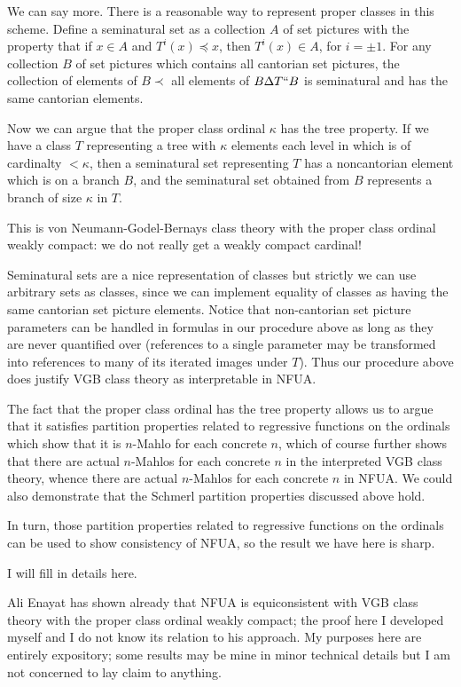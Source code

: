 \documentclass[12pt]{article}
\begin{document}
We can say more.  There is a reasonable way to represent proper classes in this scheme.  Define a seminatural set as a collection $A$ of set pictures with the property that if $x \in A$ and $T^i(x) \preceq x$, then $T^i(x) \in A$, for $i=\pm 1$.  For any
collection $B$ of set pictures which contains all cantorian set pictures, the collection of elements of $B \prec$ all elements of $B \Delta T``B$ is seminatural and has the same cantorian elements.

Now we can argue that the proper class ordinal $\kappa$ has the tree property.  If we have a class $T$ representing a tree with $\kappa$ elements each level in which is of cardinalty $<\kappa$, then a seminatural set representing $T$  has
a noncantorian element which is on a branch $B$, and the seminatural set obtained from $B$ represents a branch of size $\kappa$ in $T$.

This is von Neumann-Godel-Bernays class theory with the proper class ordinal weakly compact:  we do not really get a weakly compact cardinal!

Seminatural sets are a nice representation of classes but strictly we can use arbitrary sets as classes, since we can implement equality of classes as having the same cantorian set picture elements.  Notice that non-cantorian set picture parameters
can be handled in formulas in our procedure above as long as they are never quantified over (references to a single parameter may be transformed into references to many of its iterated images under $T$).  Thus our procedure above does justify VGB class theory as interpretable in NFUA.

The fact that the proper class ordinal has the tree property allows us to argue that it satisfies partition properties related to regressive functions on the ordinals which show that it is $n$-Mahlo for each concrete $n$, which of course further shows
that there are actual $n$-Mahlos for each concrete $n$ in the interpreted VGB class theory, whence there are actual $n$-Mahlos for each concrete $n$ in NFUA.  We could also demonstrate that the Schmerl partition properties discussed above hold.

In turn, those partition properties related to regressive functions on the ordinals can be used to show consistency of NFUA, so the result we have here is sharp.

I will fill in details here.

Ali Enayat has shown already that NFUA is equiconsistent with VGB class theory with the proper class ordinal weakly compact;  the proof here I developed myself and I do not know its relation to his approach.  My purposes here are entirely expository;  some results may be mine in minor technical details but I am not concerned to lay claim to anything.
\end{document}
